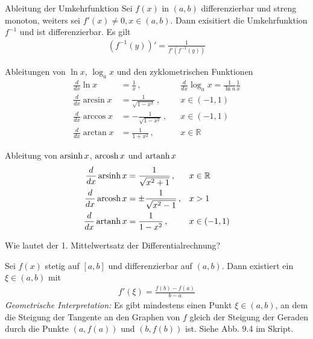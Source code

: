 \begin{karte}{Ableitung der Umkehrfunktion}
	Sei \( f(x) \) in \((a,b)\) differenzierbar und streng monoton, weiters sei \(f'(x)\neq 0, x\in(a,b)\). Dann exisitiert die Umkehrfunktion \(f^{-1}\) und ist differenzierbar. Es gilt
	\begin{align}
		(f^{-1}(y))'=\frac{1}{f'(f^{-1}(y))}
	\end{align}
\end{karte}

\begin{karte}{Ableitungen von \(\ln{x}\), \(\log_{a}{x}\) und den zyklometrischen Funktionen}
	\begin{align}
		\frac{d}{dx}\ln{x}     & =\frac{1}{x}\, ,            &   & \frac{d}{dx}\log_a x = \frac{1}{\ln{a}}\frac{1}{x} \\
		\frac{d}{dx}\arcsin{x} & =\frac{1}{\sqrt{1-x^2}}\, , &   & x\in(-1,1)                                         \\
		\frac{d}{dx}\arccos{x} & =-\frac{1}{\sqrt{1-x^2}}\,, &   & x\in(-1,1)                                         \\
		\frac{d}{dx}\arctan{x} & =\frac{1}{1+x^2}\, ,        &   & x\in\mathbb{R}
	\end{align}
\end{karte}

\begin{karte}{Ableitung von \(\operatorname{arsinh}{x}\), \(\operatorname{arcosh}{x}\) und \(\operatorname{artanh}{x}\)}
	\begin{align}
		\frac{d}{dx}\operatorname{arsinh}{x} & =\frac{1}{\sqrt{x^2+1}}\, , & x & \in\mathbb{R} \\
		\frac{d}{dx}\operatorname{arcosh}{x} & =\pm\frac{1}{{\sqrt{x^2-1}}}\, ,     & x & >1            \\
		\frac{d}{dx}\operatorname{artanh}{x} & =\frac{1}{1-x^2}\, ,        & x & \in(-1,1)
	\end{align}
\end{karte}

\begin{karte}{Wie lautet der 1. Mittelwertsatz der Differentialrechnung?}

	Sei \(f(x)\) stetig auf \([a,b]\) und differenzierbar auf \((a,b)\). Dann existiert ein \(\xi \in (a,b)\) mit
	\begin{align}
		f'(\xi)=\frac{f(b)-f(a)}{b-a}
	\end{align}
	{\large
		\emph{Geometrische Interpretation:} Es gibt mindestens einen Punkt \(\xi \in (a,b)\), an dem die Steigung der Tangente an den Graphen von $f$ gleich der Steigung der Geraden durch die Punkte \((a, f(a))\) und \((b, f(b))\) ist. Siehe Abb. 9.4 im Skript.
	}
\end{karte}



